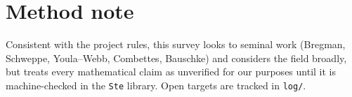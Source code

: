 \documentclass[11pt]{article}
\begin{document}
\section*{Method note}
Consistent with the project rules, this survey looks to seminal work
(Bregman, Schweppe, Youla--Webb, Combettes, Bauschke) and considers the
field broadly, but treats every mathematical claim as unverified for our
purposes until it is machine-checked in the \texttt{Ste} library. Open
targets are tracked in \texttt{log/}.



\end{document}
